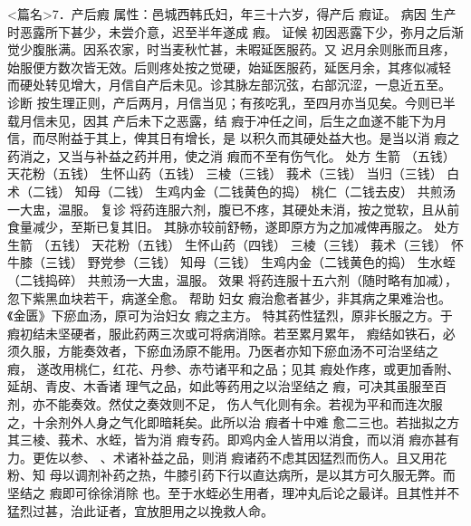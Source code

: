 \documentclass[a4paper,12pt,UTF8,twoside]{ctexbook}
\begin{document}
<篇名>7．产后瘕
属性：邑城西韩氏妇，年三十六岁，得产后 瘕证。 
病因 生产时恶露所下甚少，未尝介意，迟至半年遂成 瘕。 
证候 初因恶露下少，弥月之后渐觉少腹胀满。因系农家，时当麦秋忙甚，未暇延医服药。又 
迟月余则胀而且疼，始服便方数次皆无效。后则疼处按之觉硬，始延医服药，延医月余，其疼似减轻 
而硬处转见增大，月信自产后未见。诊其脉左部沉弦，右部沉涩，一息近五至。 
诊断 按生理正则，产后两月，月信当见；有孩吃乳，至四月亦当见矣。今则已半载月信未见，因其 
产后未下之恶露，结 瘕于冲任之间，后生之血遂不能下为月信，而尽附益于其上，俾其日有增长，是 
以积久而其硬处益大也。是当以消 瘕之药消之，又当与补益之药并用，使之消 瘕而不至有伤气化。 
处方 生箭 （五钱） 天花粉（五钱） 生怀山药（五钱） 三棱（三钱） 
莪术（三钱） 当归（三钱） 白术（二钱） 知母（二钱） 
生鸡内金（二钱黄色的捣） 桃仁（二钱去皮） 
共煎汤一大盅，温服。 
复诊 将药连服六剂，腹已不疼，其硬处未消，按之觉软，且从前食量减少，至斯已复其旧。 
其脉亦较前舒畅，遂即原方为之加减俾再服之。 
处方 生箭 （五钱） 天花粉（五钱） 生怀山药（四钱） 三棱（三钱） 
莪术（三钱） 怀牛膝（三钱） 野党参（三钱） 知母（三钱） 
生鸡内金（二钱黄色的捣） 生水蛭（二钱捣碎） 
共煎汤一大盅，温服。 
效果 将药连服十五六剂（随时略有加减），忽下紫黑血块若干，病遂全愈。 
帮助 妇女 瘕治愈者甚少，非其病之果难治也。《金匮》下瘀血汤，原可为治妇女 瘕之主方。 
特其药性猛烈，原非长服之方。于 瘕初结未坚硬者，服此药两三次或可将病消除。若至累月累年， 
瘕结如铁石，必须久服，方能奏效者，下瘀血汤原不能用。乃医者亦知下瘀血汤不可治坚结之 瘕， 
遂改用桃仁，红花、丹参、赤芍诸平和之品；见其 瘕处作疼，或更加香附、延胡、青皮、木香诸 
理气之品，如此等药用之以治坚结之 瘕，可决其虽服至百剂，亦不能奏效。然仗之奏效则不足， 
伤人气化则有余。若视为平和而连次服之，十余剂外人身之气化即暗耗矣。此所以治 瘕者十中难 
愈二三也。若拙拟之方其三棱、莪术、水蛭，皆为消 瘕专药。即鸡内金人皆用以消食，而以消 
瘕亦甚有力。更佐以参、 、术诸补益之品，则消 瘕诸药不虑其因猛烈而伤人。且又用花粉、知 
母以调剂补药之热，牛膝引药下行以直达病所，是以其方可久服无弊。而坚结之 瘕即可徐徐消除 
也。至于水蛭必生用者，理冲丸后论之最详。且其性并不猛烈过甚，治此证者，宜放胆用之以挽救人命。 
\end{document}
